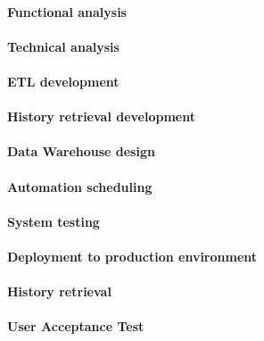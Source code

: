\paragraph{Functional analysis}
    
\paragraph{Technical analysis} 
   
\paragraph{ETL development}
    
\paragraph{History retrieval development}
    
\paragraph{Data Warehouse design} 
    
\paragraph{Automation scheduling}
    
\paragraph{System testing}
    
\paragraph{Deployment to production environment}
    
\paragraph{History retrieval}
    
\paragraph{User Acceptance Test}
    